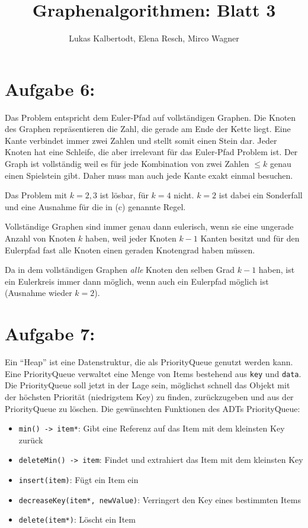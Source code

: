 \documentclass[11pt]{scrartcl} %
\title{Graphenalgorithmen: Blatt 3}
\author{Lukas Kalbertodt, Elena Resch, Mirco Wagner}
\newcommand{\func}[1]{\mbox{\texttt{#1}}}
\begin{document}
\maketitle

\section*{Aufgabe 6:}

\begin{compactenum}[(a)]
    \item Das Problem entspricht dem Euler-Pfad auf vollständigen Graphen. Die Knoten des Graphen repräsentieren die Zahl, die gerade am Ende der Kette liegt. Eine Kante verbindet immer zwei Zahlen und stellt somit einen Stein dar. Jeder Knoten hat eine Schleife, die aber irrelevant für das Euler-Pfad Problem ist. Der Graph ist vollständig weil es für jede Kombination von zwei Zahlen $\le k$ genau einen Spielstein gibt. Daher muss man auch jede Kante exakt einmal besuchen.
    \item Das Problem mit $k=2,3$ ist lösbar, für $k=4$ nicht. $k=2$ ist dabei ein Sonderfall und eine Ausnahme für die in (c) genannte Regel.
    \item Vollständige Graphen sind immer genau dann eulerisch, wenn sie eine ungerade Anzahl von Knoten $k$ haben, weil jeder Knoten $k-1$ Kanten besitzt und für den Eulerpfad fast alle Knoten einen geraden Knotengrad haben müssen.
    \item Da in dem vollständigen Graphen \emph{alle} Knoten den selben Grad $k-1$ haben, ist ein Eulerkreis immer dann möglich, wenn auch ein Eulerpfad möglich ist (Ausnahme wieder $k=2$).
\end{compactenum}

\section*{Aufgabe 7:}
Ein \enquote{Heap} ist eine Datenstruktur, die als PriorityQueue genutzt werden kann. Eine PriorityQueue verwaltet eine Menge von Items bestehend aus \func{key} und \func{data}. Die PriorityQueue soll jetzt in der Lage sein, möglichst schnell das Objekt mit der höchsten Priorität (niedrigstem Key) zu finden, zurückzugeben und aus der PriorityQueue zu löschen. Die gewünschten Funktionen des ADTs PriorityQueue:
\begin{itemize}
    \item \func{min() -> item*}: Gibt eine Referenz auf das Item mit dem kleinsten Key zurück
    \item \func{deleteMin() -> item}: Findet und extrahiert das Item mit dem kleinsten Key
    \item \func{insert(item)}: Fügt ein Item ein
    \item \func{decreaseKey(item*, newValue)}: Verringert den Key eines bestimmten Items
    \item \func{delete(item*)}: Löscht ein Item
\end{itemize}
\end{document}
